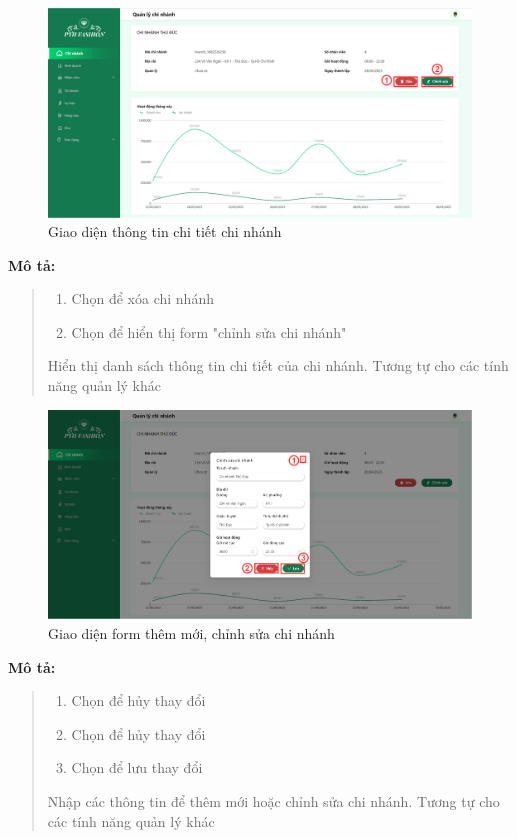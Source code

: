 \begin{figure}[!htp]
    \centering
    \includegraphics[width=12cm]{img/UI/admin_implement/branchDetail.png}
    \newline
    \caption{Giao diện thông tin chi tiết chi nhánh}
\end{figure}
\textbf{Mô tả:}
\begin{quote}
    \begin{enumerate}
        \item Chọn để xóa chi nhánh
        \item Chọn để hiển thị form "chỉnh sửa chi nhánh"
    \end{enumerate}
    Hiển thị danh sách thông tin chi tiết của chi nhánh. Tương tự cho các tính năng quản lý khác
\end{quote}


\begin{figure}[!htp]
    \centering
    \includegraphics[width=12cm]{img/UI/admin_implement/branchEdit.png}
    \newline
    \caption{Giao diện form thêm mới, chỉnh sửa chi nhánh}
\end{figure}
\textbf{Mô tả:}
\begin{quote}
    \begin{enumerate}
        \item Chọn để hủy thay đổi
        \item Chọn để hủy thay đổi
        \item Chọn để lưu thay đổi
    \end{enumerate}
    Nhập các thông tin để thêm mới hoặc chỉnh sửa chi nhánh. Tương tự cho các tính năng quản lý khác
\end{quote}

